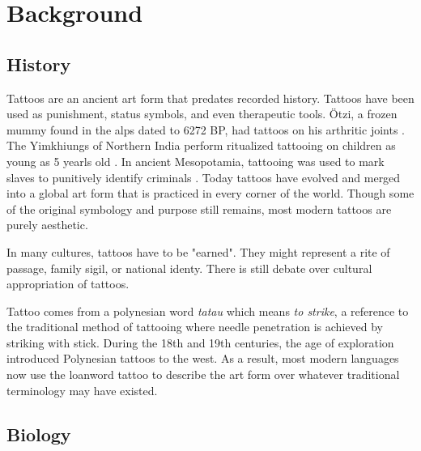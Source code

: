 \documentclass[11pt]{article}
\begin{document}
\section{Background}

\subsection{History}

Tattoos are an ancient art form that predates recorded history.
Tattoos have been used as punishment, status symbols, and even therapeutic tools.
Ötzi, a frozen mummy found in the alps dated to 6272 BP, had tattoos on his arthritic joints \cite{deterwolf_worlds_oldest}.
The Yimkhiungs of Northern India perform ritualized tattooing on children as young as 5 yearls old \cite{kluger2015cultural}.
In ancient Mesopotamia, tattooing was used to mark slaves to punitively identify criminals \cite{hawken2022tattooing}.
Today tattoos have evolved and merged into a global art form that is practiced in every corner of the world.
Though some of the original symbology and purpose still remains, most modern tattoos are purely aesthetic.

In many cultures, tattoos have to be "earned". They might represent a rite of passage, family sigil, or national identy. There is still debate over cultural appropriation of tattoos.

Tattoo comes from a polynesian word \textit{tatau} which means \textit{to strike}, a reference to the traditional method of tattooing where needle penetration is achieved by striking with stick.
During the 18th and 19th centuries, the age of exploration introduced Polynesian tattoos to the west.
As a result, most modern languages now use the loanword tattoo to describe the art form over whatever traditional terminology may have existed.

\subsection{Biology}
\end{document}
